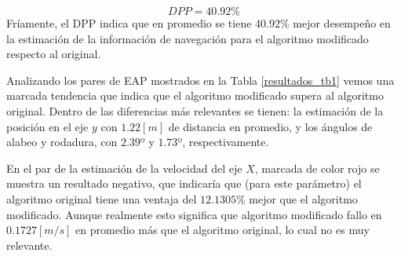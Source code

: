 \documentclass[10pt]{report}
\numberwithin{equation}{chapter}
\numberwithin{algorithm}{chapter}
\begin{document}
\begin{equation}
DPP=40.92\%
\end{equation}
Fríamente, el DPP indica que en promedio se tiene 40.92\% mejor desempeño en la estimación de la información de navegación para el algoritmo modificado respecto al original.\par
Analizando los pares de EAP mostrados en la Tabla \ref{resultados_tb1} vemos una marcada tendencia que indica que el algoritmo modificado supera al algoritmo original. Dentro de las diferencias más relevantes se tienen: la estimación de la posición en el eje $y$  con $1.22[m]$ de distancia en promedio, y los ángulos de alabeo y rodadura, con $2.39º$ y $1.73º$, respectivamente.\par
En el par de la estimación de la velocidad del eje $X$, marcada de color rojo se muestra un resultado negativo, que indicaría que (para este parámetro) el algoritmo original tiene una ventaja del $12.1305\%$ mejor que el algoritmo modificado. Aunque realmente esto significa que algoritmo modificado fallo en $0.1727[m/s]$ en promedio más que el algoritmo original, lo cual no es muy relevante.\par
\end{document}
